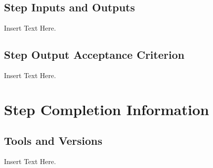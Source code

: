 \documentclass [12pt]{article}
\begin{document}
																																																																			\subsection{Step Inputs and Outputs}
																																																																			Insert Text Here.

																																																																			\subsection{Step Output Acceptance Criterion}
																																																																			Insert Text Here.





																																																																			\section{Step Completion Information}

																																																																			\subsection{Tools and Versions}
																																																																			Insert Text Here.

\end{document}
